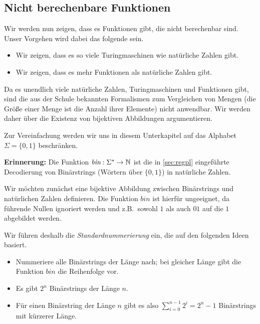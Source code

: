 \subsection{Nicht berechenbare Funktionen}

Wir werden nun zeigen, dass es Funktionen gibt, die nicht berechenbar sind.
Unser Vorgehen wird dabei das folgende sein.
\begin{itemize}
 \item Wir zeigen, dass es so viele Turingmaschinen wie natürliche Zahlen gibt.
 \item Wir zeigen, dass es mehr Funktionen als natürliche Zahlen gibt.
\end{itemize}

Da es unendlich viele natürliche Zahlen, Turingmaschinen und Funktionen gibt,
sind die aus der Schule bekannten Formalismen zum Vergleichen von Mengen
(die Größe einer Menge ist die Anzahl ihrer Elemente)
nicht anwendbar.
Wir werden daher über die Existenz von bijektiven Abbildungen argumentieren.

Zur Vereinfachung werden wir uns in diesem Unterkapitel auf das Alphabet $\Sigma=\{0,1\}$ beschränken.

\newcommand{\tmach}{\textit{TMACH}}
\newcommand{\bintonat}{\textit{bin}}
\newcommand{\stdnum}{\textit{stdnum}}
\newcommand{\nattotm}{\textit{nat2tm}}
\newcommand{\bintotm}{\textit{bin2tm}}
\newcommand{\langtopower}{\textit{lang2power}}
\newcommand{\functopower}{\textit{func2power}}

\textbf{Erinnerung: } Die Funktion $\bintonat:\Sigma^*\rightarrow\N$ 
ist die in \autoref{sec:regpl} eingeführte Decodierung von Binärstrings (Wörtern über $\{0,1\}$) in natürliche Zahlen.

Wir möchten zunächst eine bijektive Abbildung zwischen Binärstrings und natürlichen Zahlen definieren.
Die Funktion $\bintonat$ ist hierfür ungeeignet, da führende Nullen ignoriert werden und z.B.\ sowohl $1$ als auch $01$ auf die $1$ abgebildet werden.

Wir führen deshalb die \emph{Standardnummerierung} ein, die auf den folgenden Ideen basiert.
\begin{itemize}
 \item Nummeriere alle Binärstrings der Länge nach; bei gleicher Länge gibt die Funktion $\bintonat$ die Reihenfolge vor.
 \item Es gibt $2^n$ Binärstrings der Länge $n$.
 \item Für einen Binärstring der Länge $n$ gibt es also $\sum\limits_{i=0}^{n-1} 2^i = 2^n-1$ Binärstrings mit kürzerer Länge.
\end{itemize}


